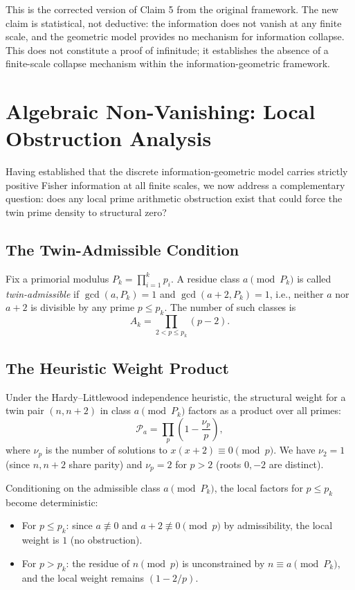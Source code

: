 \documentclass[11pt]{article}
\begin{document}
This is the corrected version of Claim 5 from the original framework. The new claim is statistical, not deductive: the information does not vanish at any finite scale, and the geometric model provides no mechanism for information collapse. This does not constitute a proof of infinitude; it establishes the absence of a finite-scale collapse mechanism within the information-geometric framework.

\section{Algebraic Non-Vanishing: Local Obstruction Analysis}

Having established that the discrete information-geometric model carries strictly positive Fisher information at all finite scales, we now address a complementary question: does any local prime arithmetic obstruction exist that could force the twin prime density to structural zero?

\subsection{The Twin-Admissible Condition}

Fix a primorial modulus $P_k = \prod_{i=1}^k p_i$. A residue class $a \pmod{P_k}$ is called
\emph{twin-admissible} if $\gcd(a, P_k) = 1$ and $\gcd(a+2, P_k) = 1$, i.e., neither $a$
nor $a+2$ is divisible by any prime $p \leq p_k$. The number of such classes is
\begin{equation}
    A_k = \prod_{2 < p \leq p_k} (p - 2).
\end{equation}

\subsection{The Heuristic Weight Product}

Under the Hardy--Littlewood independence heuristic, the structural weight for a twin pair
$(n, n+2)$ in class $a \pmod{P_k}$ factors as a product over all primes:
\begin{equation}
    \mathcal{P}_a = \prod_{p} \left(1 - \frac{\nu_p}{p}\right),
\end{equation}
where $\nu_p$ is the number of solutions to $x(x+2) \equiv 0 \pmod p$. We have $\nu_2 = 1$
(since $n, n+2$ share parity) and $\nu_p = 2$ for $p > 2$ (roots $0, -2$ are distinct).

Conditioning on the admissible class $a \pmod{P_k}$, the local factors for $p \leq p_k$
become deterministic:
\begin{itemize}
    \item For $p \leq p_k$: since $a \not\equiv 0$ and $a+2 \not\equiv 0 \pmod p$ by
          admissibility, the local weight is $1$ (no obstruction).
    \item For $p > p_k$: the residue of $n \pmod p$ is unconstrained by $n \equiv a
          \pmod{P_k}$, and the local weight remains $(1 - 2/p)$.
\end{itemize}
\end{document}
